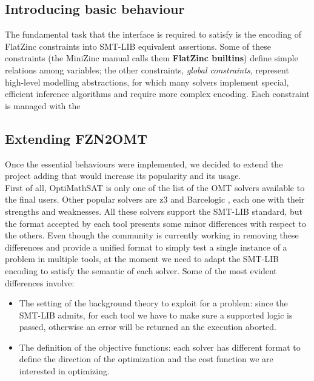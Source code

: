 \subsection{Introducing basic behaviour}

The fundamental task that the interface is required to satisfy is the encoding of FlatZinc constraints into SMT-LIB equivalent assertions. Some of these constraints (the MiniZinc manual calls them \textbf{FlatZinc builtins}) define simple relations among variables; the other constraints, \textit{global constraints}, represent high-level modelling abstractions, for which many solvers implement special, efficient inference algorithms and require more complex encoding. Each constraint is managed with the 

\subsection{Extending FZN2OMT}

Once the essential behaviours were implemented, we decided to extend the project adding that would increase its popularity and its usage.\\
First of all, OptiMathSAT is only one of the list of the OMT solvers available to the final users. Other popular solvers are z3 \cite{z3prover} and Barcelogic \cite{barcelogic}, each one with their strengths and weaknesses. All these solvers support the SMT-LIB standard, but the format accepted by each tool presents some minor differences with respect to the others. Even though the community is currently working in removing these differences and provide a unified format to simply test a single instance of a problem in multiple tools, at the moment we need to adapt the SMT-LIB encoding to satisfy the semantic of each solver. Some of the most evident differences involve:

\begin{itemize}
    \item The setting of the background theory to exploit for a problem: since the SMT-LIB admits, for each tool we have to make sure a supported logic is passed, otherwise an error will be returned an the execution aborted. 
    \item The definition of the objective functions: each solver has different format to define the direction of the optimization and the cost function we are interested in optimizing.
\end{itemize}


